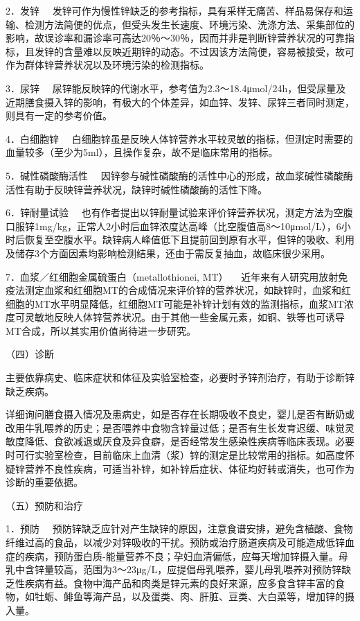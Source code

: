 {2．发锌}
　发锌可作为慢性锌缺乏的参考指标，具有采样无痛苦、样品易保存和运输、检测方法简便的优点，但受头发生长速度、环境污染、洗涤方法、采集部位的影响，故误诊率和漏诊率可高达20％～30％，因而并非是判断锌营养状况的可靠指标，且发锌的含量难以反映近期锌的动态。不过因该方法简便，容易被接受，故可作为群体锌营养状况以及环境污染的检测指标。

{3．尿锌}
　尿锌能反映锌的代谢水平，参考值为2.3～18.4μmol/24h，但受尿量及近期膳食摄入锌的影响，有极大的个体差异，如血锌、发锌、尿锌三者同时测定，则具有一定的参考价值。

{4．白细胞锌}
　白细胞锌虽是反映人体锌营养水平较灵敏的指标，但测定时需要的血量较多（至少为5ml），且操作复杂，故不是临床常用的指标。

{5．碱性磷酸酶活性}
　因锌参与碱性磷酸酶的活性中心的形成，故血浆碱性磷酸酶活性有助于反映锌营养状况，缺锌时碱性磷酸酶的活性下降。

{6．锌耐量试验}
　也有作者提出以锌耐量试验来评价锌营养状况，测定方法为空腹口服锌1mg/kg，正常人2小时后血锌浓度达高峰（比空腹值高8～10μmol/L），6小时后恢复至空腹水平。缺锌病人峰值低下且提前回到原有水平，但锌的吸收、利用及储存3个方面因素均影响检测结果，还由于需反复抽血，故临床很少采用。

{7．血浆／红细胞金属硫蛋白（metallothionei, MT）}
　近年来有人研究用放射免疫法测定血浆和红细胞MT的合成情况来评价锌的营养状况，如缺锌时，血浆和红细胞的MT水平明显降低，红细胞MT可能是补锌计划有效的监测指标，血浆MT浓度可灵敏地反映人体锌营养状况。由于其他一些金属元素，如铜、铁等也可诱导MT合成，所以其实用价值尚待进一步研究。

（四）诊断

主要依靠病史、临床症状和体征及实验室检查，必要时予锌剂治疗，有助于诊断锌缺乏疾病。

详细询问膳食摄入情况及患病史，如是否存在长期吸收不良史，婴儿是否有断奶或改用牛乳喂养的历史；是否喂养中食物含锌量过低；是否有生长发育迟缓、味觉灵敏度降低、食欲减退或厌食及异食癖，是否经常发生感染性疾病等临床表现。必要时可行实验室检查，目前临床上血清（浆）锌的测定是比较常用的指标。如高度怀疑锌营养不良性疾病，可适当补锌，如补锌后症状、体征均好转或消失，也可作为诊断的重要依据。

（五）预防和治疗

{1．预防}
　预防锌缺乏应针对产生缺锌的原因，注意食谱安排，避免含植酸、食物纤维过高的食品，以减少对锌吸收的干扰。预防或治疗肠道疾病及可能造成低锌血症的疾病，预防蛋白质-能量营养不良；孕妇血清偏低，应每天增加锌摄入量。母乳中含锌量较高，范围为3～23μg/L，应提倡母乳喂养，婴儿母乳喂养对预防锌缺乏性疾病有益。食物中海产品和肉类是锌元素的良好来源，应多食含锌丰富的食物，如牡蛎、鲱鱼等海产品，以及蛋类、肉、肝脏、豆类、大白菜等，增加锌的摄入量。

